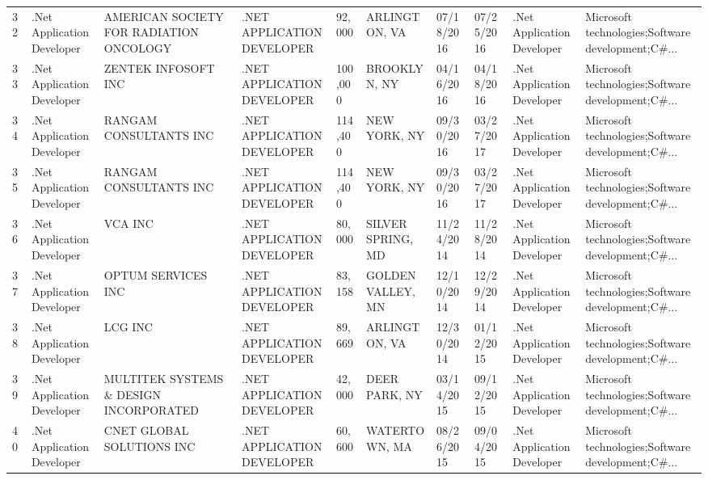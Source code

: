 \begin{table}[h!]
{\begin{tabular}{llllllllll}
	32 &  .Net Application Developer &            AMERICAN SOCIETY FOR RADIATION ONCOLOGY &  .NET APPLICATION DEVELOPER &      92,000 &       ARLINGTON, VA &  07/18/2016 &  07/25/2016 &  .Net Application Developer &  Microsoft technologies;Software development;C\#... \\
	33 &  .Net Application Developer &                                ZENTEK INFOSOFT INC &  .NET APPLICATION DEVELOPER &     100,000 &        BROOKLYN, NY &  04/16/2016 &  04/18/2016 &  .Net Application Developer &  Microsoft technologies;Software development;C\#... \\
	34 &  .Net Application Developer &                             RANGAM CONSULTANTS INC &  .NET APPLICATION DEVELOPER &     114,400 &        NEW YORK, NY &  09/30/2016 &  03/27/2017 &  .Net Application Developer &  Microsoft technologies;Software development;C\#... \\
	35 &  .Net Application Developer &                             RANGAM CONSULTANTS INC &  .NET APPLICATION DEVELOPER &     114,400 &        NEW YORK, NY &  09/30/2016 &  03/27/2017 &  .Net Application Developer &  Microsoft technologies;Software development;C\#... \\
	36 &  .Net Application Developer &                                            VCA INC &  .NET APPLICATION DEVELOPER &      80,000 &   SILVER SPRING, MD &  11/24/2014 &  11/28/2014 &  .Net Application Developer &  Microsoft technologies;Software development;C\#... \\
	37 &  .Net Application Developer &                                 OPTUM SERVICES INC &  .NET APPLICATION DEVELOPER &      83,158 &   GOLDEN VALLEY, MN &  12/10/2014 &  12/29/2014 &  .Net Application Developer &  Microsoft technologies;Software development;C\#... \\
	38 &  .Net Application Developer &                                            LCG INC &  .NET APPLICATION DEVELOPER &      89,669 &       ARLINGTON, VA &  12/30/2014 &  01/12/2015 &  .Net Application Developer &  Microsoft technologies;Software development;C\#... \\
	39 &  .Net Application Developer &             MULTITEK SYSTEMS \& DESIGN INCORPORATED &  .NET APPLICATION DEVELOPER &      42,000 &       DEER PARK, NY &  03/14/2015 &  09/12/2015 &  .Net Application Developer &  Microsoft technologies;Software development;C\#... \\
	40 &  .Net Application Developer &                          CNET GLOBAL SOLUTIONS INC &  .NET APPLICATION DEVELOPER &      60,600 &       WATERTOWN, MA &  08/26/2015 &  09/04/2015 &  .Net Application Developer &  Microsoft technologies;Software development;C\#... \\

\end{tabular}}
\end{table}
